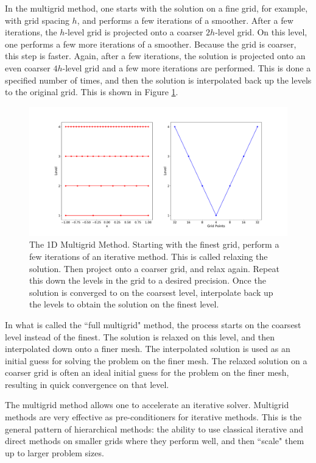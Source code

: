 In the multigrid method, one starts with the solution on a fine grid, for example, with grid spacing $h$, and performs a few iterations of a smoother. After a few iterations, the $h$-level grid is projected onto a coarser $2h$-level grid. On this level, one performs a few more iterations of a smoother. Because the grid is coarser, this step is faster. Again, after a few iterations, the solution is projected onto an even coarser $4h$-level grid and a few more iterations are performed. This is done a specified number of times, and then the solution is interpolated back up the levels to the original grid. This is shown in Figure \ref{fig:multigrid}.

\begin{figure}
    \centering
    \includegraphics[width=0.8\columnwidth]{figures/multigrid.pdf}
    \caption{The 1D Multigrid Method. Starting with the finest grid, perform a few iterations of an iterative method. This is called relaxing the solution. Then project onto a coarser grid, and relax again. Repeat this down the levels in the grid to a desired precision. Once the solution is converged to on the coarsest level, interpolate back up the levels to obtain the solution on the finest level.}
    \label{fig:multigrid}
\end{figure}

In what is called the ``full multigrid" method, the process starts on the coarsest level instead of the finest. The solution is relaxed on this level, and then interpolated down onto a finer mesh. The interpolated solution is used as an initial guess for solving the problem on the finer mesh. The relaxed solution on a coarser grid is often an ideal initial guess for the problem on the finer mesh, resulting in quick convergence on that level.

The multigrid method allows one to accelerate an iterative solver. Multigrid methods are very effective as pre-conditioners for iterative methods. This is the general pattern of hierarchical methods: the ability to use classical iterative and direct methods on smaller grids where they perform well, and then ``scale" them up to larger problem sizes.

